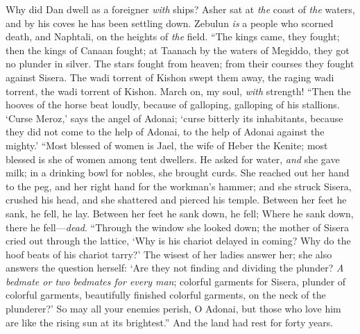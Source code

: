 \begin{biblechapter}
Why did Dan dwell as a foreigner \textit{with} ships? 
Asher sat at \textit{the} coast of \textit{the} waters, 
and by his coves he has been settling down.
\verse Zebulun \textit{is} a people who scorned death, 
and Naphtali, on the heights of \textit{the} field.
\verse “The kings came, they fought; 
then the kings of Canaan fought; 
at Taanach by the waters of Megiddo, 
they got no plunder in silver.
\verse The stars fought from heaven; 
from their courses they fought against Sisera.
\verse The wadi torrent of Kishon swept them away, 
the raging wadi torrent, 
the wadi torrent of Kishon. 
March on, my soul, \textit{with} strength!
\verse “Then the hooves of the horse beat loudly, 
because of galloping, galloping of his stallions.
\verse ‘Curse Meroz,’ says the angel of Adonai; 
‘curse bitterly its inhabitants, 
because they did not come to the help of Adonai, 
to the help of Adonai against the mighty.’
\verse “Most blessed of women is Jael, 
the wife of Heber the Kenite; 
most blessed is she of women among tent dwellers.
\verse He asked for water, \textit{and} she gave milk; 
in a drinking bowl for nobles, she brought curds.
\verse She reached out her hand to the peg, 
and her right hand for the workman’s hammer; 
and she struck Sisera, crushed his head, 
and she shattered and pierced his temple.
\verse Between her feet he sank, he fell, he lay. 
Between her feet he sank down, he fell; 
Where he sank down, there he fell—\textit{dead}.
\verse “Through the window she looked down; 
the mother of Sisera cried out through the lattice, 
‘Why is his chariot delayed in coming? 
Why do the hoof beats of his chariot tarry?’
\verse The wisest of her ladies answer her; 
she also answers the question herself:
\verse ‘Are they not finding and dividing the plunder? 
\textit{A bedmate or two bedmates for every man}; 
colorful garments for Sisera, 
plunder of colorful garments, 
beautifully finished colorful garments, 
on the neck of the plunderer?’
\verse So may all your enemies perish, O Adonai, 
but those who love him are like the rising sun at its brightest.” And the land had rest for forty years.
\end{biblechapter}

